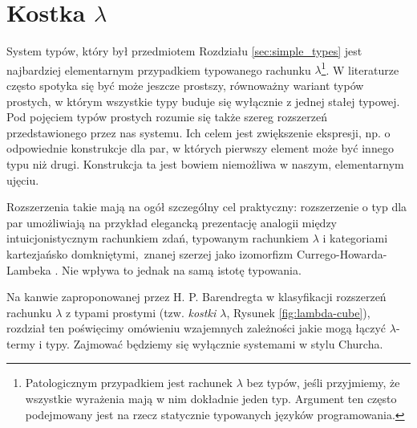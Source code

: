 \section{Kostka \(\lambda\)}

System typów, który był przedmiotem Rozdziału \ref{sec:simple_types} jest najbardziej elementarnym przypadkiem typowanego rachunku \(\lambda\)\footnote{Patologicznym przypadkiem jest rachunek \(\lambda\) bez typów, jeśli przyjmiemy, że wszystkie wyrażenia mają w nim dokładnie jeden typ. Argument ten często podejmowany jest na rzecz statycznie typowanych języków programowania.}. W literaturze często spotyka się być może jeszcze prostszy, równoważny wariant typów prostych, w którym wszystkie typy buduje się wyłącznie z jednej stałej typowej. Pod pojęciem typów prostych rozumie się także szereg rozszerzeń przedstawionego przez nas systemu. Ich celem jest zwiększenie ekspresji, np. o odpowiednie konstrukcje dla par, w których pierwszy element może być innego typu niż drugi. Konstrukcja ta jest bowiem niemożliwa w naszym, elementarnym ujęciu.

Rozszerzenia takie mają na ogół szczególny cel praktyczny: rozszerzenie o typ dla par umożliwiają na przykład elegancką prezentację analogii między intuicjonistycznym rachunkiem zdań, typowanym rachunkiem \(\lambda\) i kategoriami kartezjańsko domkniętymi, znanej szerzej jako izomorfizm Currego-Howarda-Lambeka \cite[Rozdział 3.1]{Girard:1989:PT:64805}. Nie wpływa to jednak na samą istotę typowania.  

Na kanwie zaproponowanej przez H. P. Barendregta w \cite[Rozdział 5]{Barendregt_1992} klasyfikacji rozszerzeń rachunku \(\lambda\) z typami prostymi (tzw. \emph{kostki \(\lambda\)}, Rysunek \ref{fig:lambda-cube}), rozdział ten poświęcimy omówieniu wzajemnych zależności jakie mogą łączyć \(\lambda\)-termy i typy. Zajmować będziemy się wyłącznie systemami w stylu Churcha.

